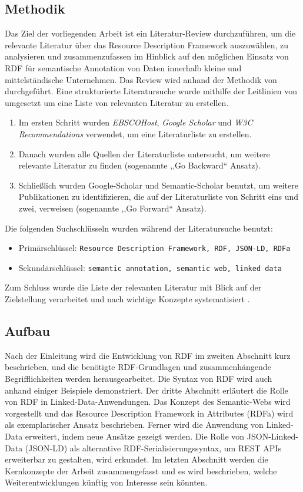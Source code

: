 \subsection{Methodik}
Das Ziel der vorliegenden Arbeit ist ein Literatur-Review durchzuführen, um die relevante Literatur über das Resource Description Framework auszuwählen, zu analysieren und zusammenzufassen im Hinblick auf den möglichen Einsatz von RDF für semantische Annotation von Daten innerhalb kleine und mittelständische Unternehmen. Das Review wird anhand der Methodik von \cite{fettke2006state} durchgeführt. Eine strukturierte Literatursuche wurde mithilfe der Leitlinien von \cite[S. XVI]{webster2002analyzing} umgesetzt um eine Liste von relevanten Literatur zu erstellen. 
\begin{enumerate}
	\item Im ersten Schritt wurden \emph{EBSCOHost}, \emph{Google Scholar} und \emph{W3C Recommendations} verwendet, um eine Literaturliste zu erstellen.
	\item Danach wurden alle Quellen der Literaturliste untersucht, um weitere relevante Literatur zu finden (sogenannte ,,Go Backward`` Ansatz).
	\item Schließlich wurden Google-Scholar und Semantic-Scholar benutzt, um weitere Publikationen zu identifizieren, die auf der Literaturliste von Schritt eins und zwei, verweisen (sogenannte ,,Go Forward`` Ansatz).
\end{enumerate}
Die folgenden Suchschlüsseln wurden während der Literatursuche benutzt:
\begin{itemize}
	\item Primärschlüssel: \texttt{Resource Description Framework, RDF, JSON-LD, RDFa}
	\item Sekundärschlüssel: \texttt{semantic annotation, semantic web, linked data}
\end{itemize}
Zum Schluss wurde die Liste der relevanten Literatur mit Blick auf der Zielstellung verarbeitet und nach wichtige Konzepte systematisiert \parencite[vgl.][S. XVI]{webster2002analyzing}.
\subsection{Aufbau}
Nach der Einleitung wird die Entwicklung von RDF im zweiten Abschnitt kurz beschrieben, und die benötigte RDF-Grundlagen und zusammenhängende Begrifflichkeiten werden herausgearbeitet. Die Syntax von RDF wird auch anhand einiger Beispiele demonstriert. Der dritte Abschnitt erläutert die Rolle von RDF in Linked-Data-Anwendungen. Das Konzept des Semantic-Webs wird vorgestellt und das Resource Description Framework in Attributes (RDFa) wird als exemplarischer Ansatz beschrieben. Ferner wird die Anwendung von Linked-Data erweitert, indem neue Ansätze gezeigt werden. Die Rolle von JSON-Linked-Data (JSON-LD) als alternative RDF-Serialisierungssyntax, um REST APIs erweiterbar zu gestalten, wird erkundet. Im letzten Abschnitt werden die Kernkonzepte der Arbeit zusammengefasst und es wird beschrieben, welche Weiterentwicklungen künftig von Interesse sein könnten.